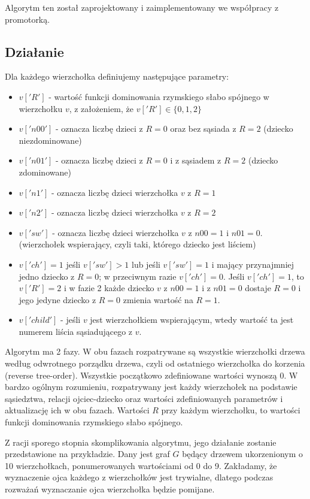 Algorytm ten został zaprojektowany i zaimplementowany we współpracy z promotorką.

\subsection{Działanie}

Dla każdego wierzchołka definiujemy następujące parametry:
\begin{itemize}
    \item $v['R']$ - wartość funkcji dominowania rzymskiego słabo spójnego w wierzchołku $v$, z założeniem, że $v['R']\in\{0,1,2\}$
    \item $v['n00']$ - oznacza liczbę dzieci z $R=0$ oraz bez sąsiada z $R=2$ (dziecko niezdominowane)
    \item $v['n01']$ - oznacza liczbę dzieci z $R=0$ i z sąsiadem z $R=2$ (dziecko zdominowane)
    \item $v['n1']$ - oznacza liczbę dzieci wierzchołka $v$ z $R = 1$
    \item $v['n2']$ - oznacza liczbę dzieci wierzchołka $v$ z $R = 2$
    \item $v['sw']$ - oznacza liczbę dzieci wierzchołka $v$ z $n00=1$ i $n01=0$. (wierzchołek wspierający, czyli taki, którego dziecko jest liściem)
    \item $v['ch'] =1$ jeśli $v['sw']>1$ lub jeśli $v['sw']=1$ i mający przynajmniej jedno dziecko z $R=0$; w przeciwnym razie $v['ch'] =0$. Jeśli $v['ch'] =1$, to $v['R']=2$ i w fazie 2 każde dziecko $v$ z $n00=1$ i z $n01=0$ dostaje $R=0$ i jego jedyne dziecko z $R=0$ zmienia wartość na $R=1$.
    \item $v['child']$ - jeśli $v$ jest wierzchołkiem wspierającym, wtedy wartość ta jest numerem liścia sąsiadującego z $v$.
\end{itemize}

Algorytm ma 2 fazy. W obu fazach rozpatrywane są wszystkie wierzchołki drzewa według odwrotnego porządku drzewa, czyli od ostatniego wierzchołka do korzenia (reverse tree-order). Wszystkie początkowo zdefiniowane wartości wynoszą 0. W bardzo ogólnym rozumieniu, rozpatrywany jest każdy wierzchołek na podstawie sąsiedztwa, relacji ojciec-dziecko oraz wartości zdefiniowanych parametrów i aktualizację ich w obu fazach. Wartości $R$ przy każdym wierzchołku, to wartości funkcji dominowania rzymskiego słabo spójnego.

Z racji sporego stopnia skomplikowania algorytmu, jego działanie zostanie przedstawione na przykładzie.
Dany jest graf $G$ będący drzewem ukorzenionym o 10 wierzchołkach, ponumerowanych wartościami od 0 do 9. Zakładamy, że wyznaczenie ojca każdego z wierzchołków jest trywialne, dlatego podczas rozważań wyznaczanie ojca wierzchołka będzie pomijane.

